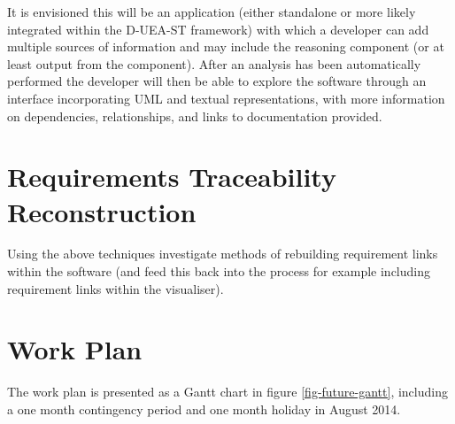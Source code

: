 It is envisioned this will be an application (either standalone or more likely integrated within the D-UEA-ST framework) with which a developer can add multiple sources of information and may include the reasoning component (or at least output from the component). After an analysis has been automatically performed the developer will then be able to explore the software through an interface incorporating UML and textual representations, with more information on dependencies, relationships, and links to documentation provided.

\section{Requirements Traceability Reconstruction}

Using the above techniques investigate methods of rebuilding requirement links within the software (and feed this back into the process for example including requirement links within the visualiser).

\section{Work Plan}

The work plan is presented as a Gantt chart in figure \ref{fig-future-gantt}, including a one month contingency period and one month holiday in August 2014.

